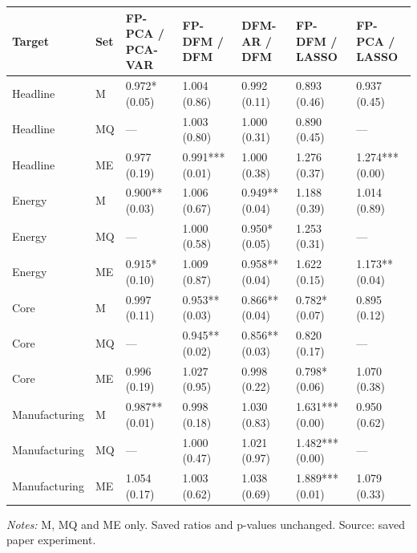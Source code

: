 \begin{threeparttable}
\begin{tabular}{lllllll}
\toprule
Target & Set & FP-PCA / PCA-VAR & FP-DFM / DFM & DFM-AR / DFM & FP-DFM / LASSO & FP-PCA / LASSO \\
\midrule
Headline & M & 0.972* (0.05) & 1.004 (0.86) & 0.992 (0.11) & 0.893 (0.46) & 0.937 (0.45) \\
Headline & MQ & --- & 1.003 (0.80) & 1.000 (0.31) & 0.890 (0.45) & --- \\
Headline & ME & 0.977 (0.19) & 0.991*** (0.01) & 1.000 (0.38) & 1.276 (0.37) & 1.274*** (0.00) \\
Energy & M & 0.900** (0.03) & 1.006 (0.67) & 0.949** (0.04) & 1.188 (0.39) & 1.014 (0.89) \\
Energy & MQ & --- & 1.000 (0.58) & 0.950* (0.05) & 1.253 (0.31) & --- \\
Energy & ME & 0.915* (0.10) & 1.009 (0.87) & 0.958** (0.04) & 1.622 (0.15) & 1.173** (0.04) \\
Core & M & 0.997 (0.11) & 0.953** (0.03) & 0.866** (0.04) & 0.782* (0.07) & 0.895 (0.12) \\
Core & MQ & --- & 0.945** (0.02) & 0.856** (0.03) & 0.820 (0.17) & --- \\
Core & ME & 0.996 (0.19) & 1.027 (0.95) & 0.998 (0.22) & 0.798* (0.06) & 1.070 (0.38) \\
Manufacturing & M & 0.987** (0.01) & 0.998 (0.18) & 1.030 (0.83) & 1.631*** (0.00) & 0.950 (0.62) \\
Manufacturing & MQ & --- & 1.000 (0.47) & 1.021 (0.97) & 1.482*** (0.00) & --- \\
Manufacturing & ME & 1.054 (0.17) & 1.003 (0.62) & 1.038 (0.69) & 1.889*** (0.01) & 1.079 (0.33) \\
\bottomrule
\end{tabular}
\begin{tablenotes}[flushleft]\footnotesize
\item \textit{Notes:} M, MQ and ME only. Saved ratios and p-values unchanged. Source: saved paper experiment.
\end{tablenotes}
\end{threeparttable}
